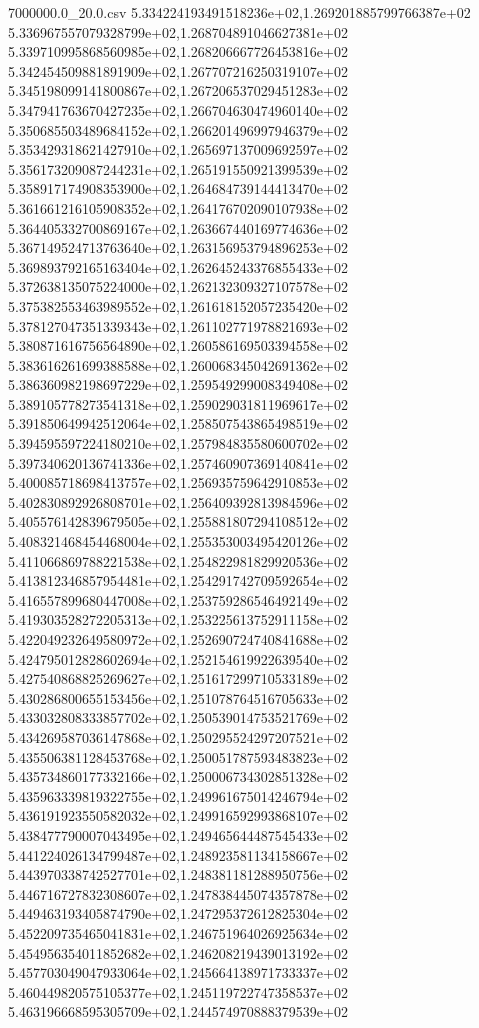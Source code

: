 \begin{filecontents*}{7000000.0_20.0.csv}
5.334224193491518236e+02,1.269201885799766387e+02
5.336967557079328799e+02,1.268704891046627381e+02
5.339710995868560985e+02,1.268206667726453816e+02
5.342454509881891909e+02,1.267707216250319107e+02
5.345198099141800867e+02,1.267206537029451283e+02
5.347941763670427235e+02,1.266704630474960140e+02
5.350685503489684152e+02,1.266201496997946379e+02
5.353429318621427910e+02,1.265697137009692597e+02
5.356173209087244231e+02,1.265191550921399539e+02
5.358917174908353900e+02,1.264684739144413470e+02
5.361661216105908352e+02,1.264176702090107938e+02
5.364405332700869167e+02,1.263667440169774636e+02
5.367149524713763640e+02,1.263156953794896253e+02
5.369893792165163404e+02,1.262645243376855433e+02
5.372638135075224000e+02,1.262132309327107578e+02
5.375382553463989552e+02,1.261618152057235420e+02
5.378127047351339343e+02,1.261102771978821693e+02
5.380871616756564890e+02,1.260586169503394558e+02
5.383616261699388588e+02,1.260068345042691362e+02
5.386360982198697229e+02,1.259549299008349408e+02
5.389105778273541318e+02,1.259029031811969617e+02
5.391850649942512064e+02,1.258507543865498519e+02
5.394595597224180210e+02,1.257984835580600702e+02
5.397340620136741336e+02,1.257460907369140841e+02
5.400085718698413757e+02,1.256935759642910853e+02
5.402830892926808701e+02,1.256409392813984596e+02
5.405576142839679505e+02,1.255881807294108512e+02
5.408321468454468004e+02,1.255353003495420126e+02
5.411066869788221538e+02,1.254822981829920536e+02
5.413812346857954481e+02,1.254291742709592654e+02
5.416557899680447008e+02,1.253759286546492149e+02
5.419303528272205313e+02,1.253225613752911158e+02
5.422049232649580972e+02,1.252690724740841688e+02
5.424795012828602694e+02,1.252154619922639540e+02
5.427540868825269627e+02,1.251617299710533189e+02
5.430286800655153456e+02,1.251078764516705633e+02
5.433032808333857702e+02,1.250539014753521769e+02
5.434269587036147868e+02,1.250295524297207521e+02
5.435506381128453768e+02,1.250051787593483823e+02
5.435734860177332166e+02,1.250006734302851328e+02
5.435963339819322755e+02,1.249961675014246794e+02
5.436191923550582032e+02,1.249916592993868107e+02
5.438477790007043495e+02,1.249465644487545433e+02
5.441224026134799487e+02,1.248923581134158667e+02
5.443970338742527701e+02,1.248381181288950756e+02
5.446716727832308607e+02,1.247838445074357878e+02
5.449463193405874790e+02,1.247295372612825304e+02
5.452209735465041831e+02,1.246751964026925634e+02
5.454956354011852682e+02,1.246208219439013192e+02
5.457703049047933064e+02,1.245664138971733337e+02
5.460449820575105377e+02,1.245119722747358537e+02
5.463196668595305709e+02,1.244574970888379539e+02

\end{filecontents*}

